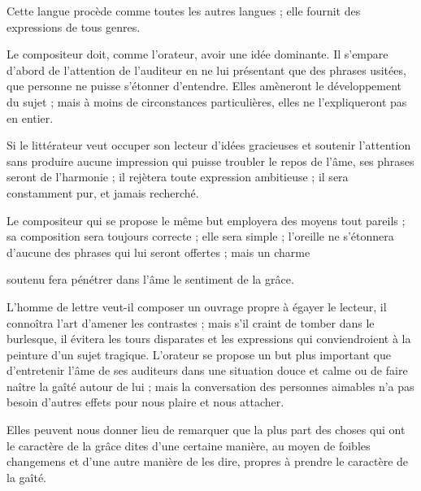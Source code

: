 \documentclass[11pt,a4paper]{article}
\begin{document}
Cette langue procède comme toutes les autres langues ; elle
 fournit des expressions de tous genres.

Le compositeur doit, comme l'orateur, avoir une idée dominante. Il
s'empare d'abord de l'attention de l'auditeur en ne lui présentant que
des phrases usitées, 
que personne ne puisse s'étonner d'entendre. Elles amèneront le
développement du sujet ; mais à moins de circonstances particulières,
elles ne  l'expliqueront pas en entier.

Si le littérateur veut occuper son lecteur d'idées gracieuses et
 soutenir l'attention sans produire aucune impression qui
puisse troubler le repos de l'âme, ses phrases  seront de
l'harmonie ; il  rejètera toute expression ambitieuse ;
il sera constamment pur, et jamais recherché.

Le compositeur qui se propose le même but employera des moyens tout
pareils ; sa composition sera toujours correcte ; elle sera simple ;
l'oreille ne s'étonnera d'aucune des phrases qui lui seront offertes ;
mais un charme 

 soutenu fera pénétrer dans l'âme le sentiment de la
grâce.

L'homme de lettre veut-il composer un ouvrage propre à égayer le lecteur,
il connoîtra l'art d'amener les contrastes ; mais s'il craint de tomber
dans le burlesque, il évitera les tours disparates et les expressions
 qui conviendroient à la peinture d'un sujet tragique.
L'orateur se propose  un but plus important que
d'entretenir l'âme de ses auditeurs dans une situation douce et calme ou
de faire  naître la gaîté autour de lui ; mais la
conversation des  personnes aimables n'a pas 
besoin d'autres  effets pour nous plaire et nous attacher.

Elles peuvent nous donner lieu de remarquer que la plus part des choses
qui  ont le caractère de la grâce 
dites d'une certaine manière,  
 au moyen  de foibles changemens et
d'une autre manière de les dire, propres à prendre le caractère de la
gaîté.
\end{document}
